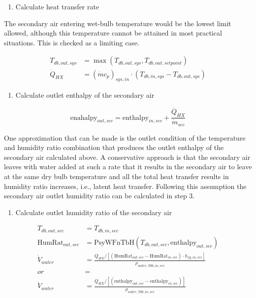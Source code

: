 \begin{enumerate}
\def\labelenumi{\arabic{enumi}.}
\tightlist
\item
  Calculate heat transfer rate
\end{enumerate}

The secondary air entering wet-bulb temperature would be the lowest limit allowed, although this temperature cannot be attained in most practical situations. This is checked as a limiting case.

\begin{equation}
  \begin{array}{rl}
    T_{db,out,sys} & = \max\left(T_{db,out,sys},T_{db,out,setpoint}\right) \\
    \dot{Q}_{HX} & = \left(\dot{m}c_p\right)_{sys,in} \cdot \left(T_{db,in,sys}-T_{db,out,sys}\right)
  \end{array}
\end{equation}

\begin{enumerate}
\def\labelenumi{\arabic{enumi}.}
\setcounter{enumi}{1}
\tightlist
\item
  Calculate outlet enthalpy of the secondary air
\end{enumerate}

\begin{equation}
\text{enahalpy}_{out,sec} = \text{enthalpy}_{in,sec} + \frac{\dot{Q}_{HX}}{\dot{m}_{sec}}
\end{equation}

One approximation that can be made is the outlet condition of the temperature and humidity ratio combination that produces the outlet enthalpy of the secondary air calculated above. A conservative approach is that the secondary air leaves with water added at such a rate that it results in the secondary air to leave at the same dry bulb temperature and all the total heat transfer results in humidity ratio increases, i.e., latent heat transfer. Following this assumption the secondary air outlet humidity ratio can be calculated in step 3.

\begin{enumerate}
\def\labelenumi{\arabic{enumi}.}
\setcounter{enumi}{2}
\tightlist
\item
  Calculate outlet humidity ratio of the secondary air
\end{enumerate}

\begin{equation}
  \begin{array}{rl}
    T_{db,out,sec} & = T_{db,in,sec} \\
    \text{HumRat}_{out,sec} & = \text{PsyWFnTbH}\left(T_{db,out,sec},\text{enthalpy}_{out,sec}\right) \\
    \dot{V}_{water} & = \frac{\dot{Q}_{HX} / \left[ \left(\text{HumRat}_{out,sec}-\text{HumRat}_{in,sec}\right) \cdot h_{fg,in,sec}\right]}{\rho_{water,Tdb,in,sec}} \\
    or & = \\
    \dot{V}_{water} & = \frac{\dot{Q}_{HX} / \left[ \left(\text{enthalpy}_{out,sec}-\text{enthalpy}_{in,sec}\right) \right]}{\rho_{water,Tdb,in,sec}}
  \end{array}
\end{equation}

